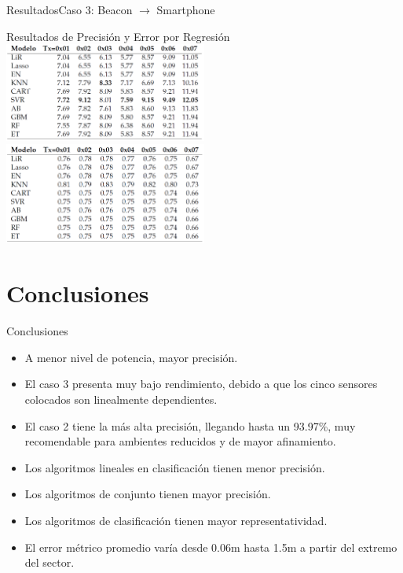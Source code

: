 \documentclass[10pt]{beamer}
\begin{document}
\begin{frame}{Resultados}{Caso 3: Beacon $\rightarrow$ Smartphone}
\begin{block}{Resultados de Precisión y Error por Regresión}
\includegraphics[width=0.5\textwidth]{AAUgraphics/movRegresion}
\includegraphics[width=0.5\textwidth]{AAUgraphics/movRegresionErr}
\end{block}
\end{frame}

\section{Conclusiones}
\begin{frame}{Conclusiones}{}
\begin{itemize}
	\item A menor nivel de potencia, mayor precisión.
	\item El caso 3 presenta muy bajo
rendimiento, debido a que los cinco sensores colocados son linealmente
dependientes.
	\item El caso 2 tiene la más alta precisión, llegando hasta un
93.97\%,  muy recomendable para ambientes reducidos y de mayor afinamiento.
	\item Los algoritmos lineales en clasificación tienen menor precisión.
	\item Los algoritmos de conjunto tienen mayor precisión.
	\item Los algoritmos de clasificación tienen mayor representatividad.
	\item El error métrico promedio varía desde 0.06m hasta 1.5m a partir del extremo del sector.  
\end{itemize}
\end{frame}
%
%
%
{\aauwavesbg%
\begin{frame}%
\end{frame}}
\end{document}

